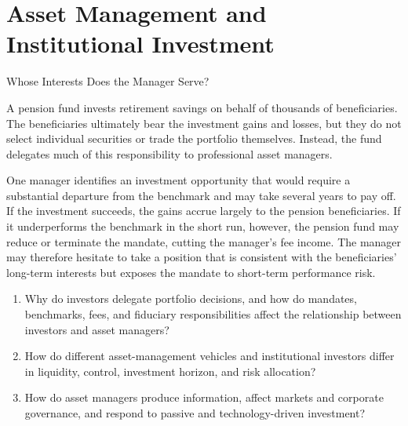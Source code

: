 \chapter{Asset Management and Institutional Investment}
\label{chap:Asset_Management_and_Institutional_Investment}

\begin{openingcase}{Whose Interests Does the Manager Serve?}

A pension fund invests retirement savings on behalf of thousands of beneficiaries. The beneficiaries ultimately bear the investment gains and losses, but they do not select individual securities or trade the portfolio themselves. Instead, the fund delegates much of this responsibility to professional asset managers.

One manager identifies an investment opportunity that would require a substantial departure from the benchmark and may take several years to pay off. If the investment succeeds, the gains accrue largely to the pension beneficiaries. If it underperforms the benchmark in the short run, however, the pension fund may reduce or terminate the mandate, cutting the manager's fee income. The manager may therefore hesitate to take a position that is consistent with the beneficiaries' long-term interests but exposes the mandate to short-term performance risk.

\end{openingcase}


\begin{tcolorbox}[
  enhanced,
  colback=FinanceBlue!6,
  colframe=FinanceBlue,
  boxrule=0.6pt,
  sharp corners,
  left=8pt,
  right=8pt,
  top=7pt,
  bottom=7pt,
  before skip=1em,
  after skip=1.6em,
  title=\textbf{Core Questions},
  coltitle=white,
  colbacktitle=FinanceBlue,
  fonttitle=\bfseries,
  attach boxed title to top left={xshift=6pt,yshift=-2mm},
  boxed title style={
    boxrule=0pt,
    sharp corners,
    left=5pt,
    right=5pt,
    top=2pt,
    bottom=2pt
  }
]
\begin{enumerate}[
  leftmargin=*,
  label=\textcolor{FinanceBlue}{\textbf{\arabic*.}},
  itemsep=0.55em,
  topsep=0.2em
]


\item Why do investors delegate portfolio decisions, and how do mandates, benchmarks, fees, and fiduciary responsibilities affect the relationship between investors and asset managers?

\item How do different asset-management vehicles and institutional investors differ in liquidity, control, investment horizon, and risk allocation?

\item How do asset managers produce information, affect markets and corporate governance, and respond to passive and technology-driven investment?


\end{enumerate}
\end{tcolorbox}

